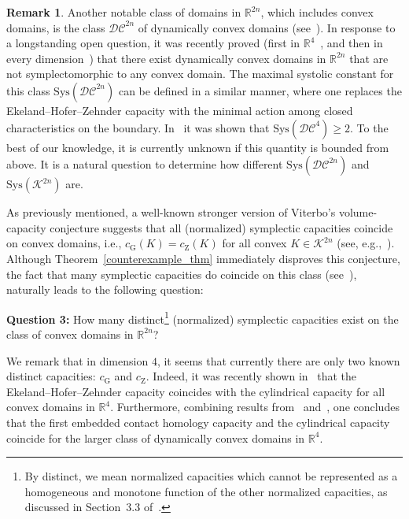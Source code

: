 \documentclass[10pt,a4paper]{article}
\theoremstyle{definition}
\newtheorem{remark}[theorem]{Remark}
\newcommand{\R}{{\mathbb{R}}}
\begin{document}
\begin{remark} Another notable class of domains in $\R^{2n}$, which includes convex domains, is the class $\mathcal {DC}^{2n}$ of dynamically convex domains (see~\cite{HWZ-3dconvex}).
In response to a longstanding open question, it was recently proved (first in $\R^4$~\cite{dynconvnotconvdim4}, and then in every dimension~\cite{dynconvnotconvdim2n}) that 
there exist dynamically convex domains in $\R^{2n}$
that are not symplectomorphic to any convex domain.
The maximal systolic constant for this class $\mathrm{Sys}(\mathcal {DC}^{2n})$ can be defined in a similar manner, where one replaces the Ekeland--Hofer--Zehnder capacity with the minimal action among closed characteristics on the boundary. In~\cite{Systolicratio} it was shown that $\mathrm{Sys}(\mathcal {DC}^{4}) \geq 2$. To the best of our knowledge, it is currently unknown if this quantity is bounded from above.  
It is a natural question  to determine how different $\mathrm{Sys}(\mathcal {DC}^{2n})$ and $\mathrm{Sys}(\mathcal {K}^{2n})$ are.
\end{remark}








\vskip 3pt

As previously mentioned, a well-known stronger version of Viterbo's volume-capacity conjecture suggests that all (normalized) symplectic capacities coincide on convex domains, i.e., \( c_{\mathrm{G}}(K) = c_{\mathrm{Z}}(K) \) for all convex \( K \in {\mathcal K}^{2n} \) (see, e.g.,~\cite{capacity_survey_1, hermann}). 
Although Theorem~\ref{counterexample_thm} immediately disproves this conjecture, the fact that many symplectic capacities do coincide on this class (see~\cite{A-E-K,hofer-zehnder, hofer-ekeland, viterbo_cap, irie, abbondandolo-kang, Gu-Ha, ginzburg-shon, gutt-hutchings-ramos}), naturally leads to the following question:

\medskip

{\bf Question 3:} How many distinct\footnote{By distinct, we mean normalized capacities which cannot be represented as a homogeneous and monotone function of the other normalized capacities, as discussed in Section~3.3 of~\cite{capacity_survey_1}.} (normalized) symplectic capacities exist on the class of convex domains in ${\mathbb R}^{2n}$?

\medskip

We remark that in dimension $4$, it seems that currently there are only two known distinct capacities: $c_{\mathrm{G}}$ and $c_{\mathrm{Z}}$. 
 Indeed, it was recently shown in~\cite{A-E-K} that the Ekeland--Hofer--Zehnder capacity coincides with the cylindrical capacity for all convex domains in \( \mathbb{R}^4 \). 
Furthermore, combining results from~\cite{edtmair} and~\cite{Hryniewicz-Hutchings-Ramos}, one concludes that the first embedded contact homology  capacity and the cylindrical capacity coincide for the larger class of dynamically convex domains in $\R^4$. 
\end{document}
